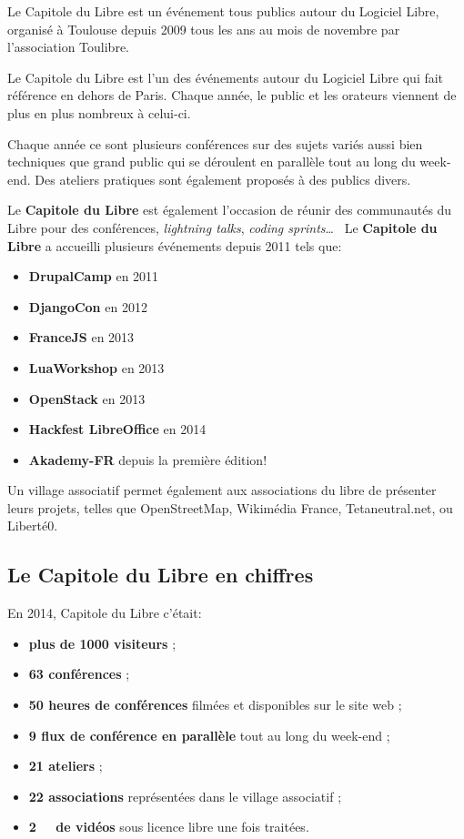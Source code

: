 
Le Capitole du Libre est un événement tous publics autour du Logiciel Libre,
 organisé à Toulouse depuis 2009 tous les ans au mois de novembre
 par l'association Toulibre.

Le Capitole du Libre est l'un des événements autour du Logiciel Libre
 qui fait référence en dehors de Paris.
 Chaque année, le public et les orateurs viennent de plus en plus nombreux
 à celui-ci.

Chaque année ce sont plusieurs conférences sur des sujets variés
 aussi bien techniques que grand public qui se déroulent en parallèle
 tout au long du week-end.
 Des ateliers pratiques sont également proposés à des publics divers.

\Separateur

Le \textbf{Capitole du Libre} est également l'occasion de réunir des 
communautés du Libre pour des conférences, \textit{lightning talks}, 
\textit{coding sprints}\dots ~ Le \textbf{Capitole du Libre} a 
accueilli plusieurs événements depuis 2011 tels que:
\begin{itemize}[label=$\bullet$]
\item \textbf{DrupalCamp} en 2011
\item \textbf{DjangoCon} en 2012
\item \textbf{FranceJS} en 2013
\item \textbf{LuaWorkshop} en 2013
\item \textbf{OpenStack} en 2013
\item \textbf{Hackfest LibreOffice}  en 2014
\item \textbf{Akademy-FR} depuis la première édition!
\end{itemize}

\Separateur

Un village associatif permet également aux associations du libre de
 présenter leurs projets, telles que OpenStreetMap, Wikimédia France, 
Tetaneutral.net, ou Liberté0.

\subsection{Le Capitole du Libre en chiffres}

En 2014, Capitole du Libre c'était:
\begin{itemize}[label=$\bullet$]
\item \textbf{plus de 1000 visiteurs} ;
\item \textbf{63 conférences} ;
\item \textbf{50 heures de conférences} filmées et disponibles sur le site web ;
\item \textbf{9 flux de conférence en parallèle} tout au long du week-end ;
\item \textbf{21 ateliers} ;
\item \textbf{22 associations} représentées dans le village associatif ;
\item \textbf{\SI{2}{\tebi\byte} de vidéos} sous licence libre une fois traitées.
\end{itemize}

